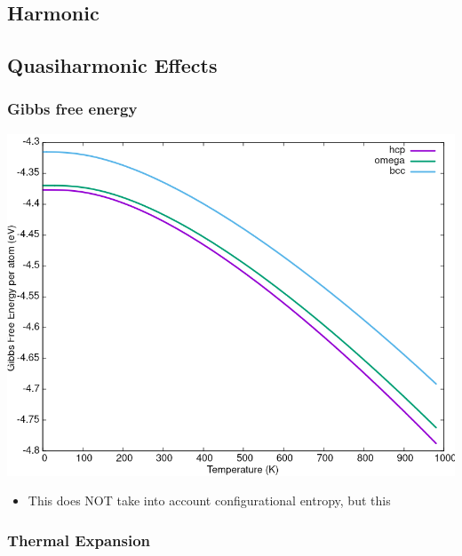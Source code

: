 \documentclass[11pt]{article}
\begin{document}
\subsection{Harmonic}
\label{sec:org80f0c79}

\subsection{Quasiharmonic Effects}
\label{sec:org91626cb}

\subsubsection{Gibbs free energy}
\label{sec:orgaa0bc9e}

\begin{center}
\includegraphics[width=.9\linewidth]{Images/gibbs_free_energy_per_atom_2020-04-02.png}
\end{center}

\begin{itemize}
\item This does NOT take into account configurational entropy, but
this
\end{itemize}

\subsubsection{Thermal Expansion}
\label{sec:org617b991}
\end{document}
